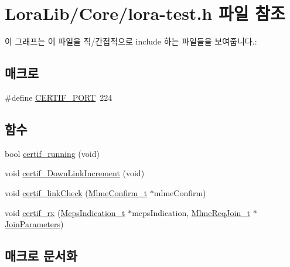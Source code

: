 \hypertarget{lora-test_8h}{}\section{Lora\+Lib/\+Core/lora-\/test.h 파일 참조}
\label{lora-test_8h}
이 그래프는 이 파일을 직/간접적으로 include 하는 파일들을 보여줍니다.\+:
\subsection*{매크로}
\begin{DoxyCompactItemize}
\item 
\#define \mbox{\hyperlink{lora-test_8h_a36fba7ec3073a500e5a2caaf0c361a99}{C\+E\+R\+T\+I\+F\+\_\+\+P\+O\+RT}}~224
\end{DoxyCompactItemize}
\subsection*{함수}
\begin{DoxyCompactItemize}
\item 
bool \mbox{\hyperlink{lora-test_8h_ae856642063d609fa42633f12c85fa318}{certif\+\_\+running}} (void)
\item 
void \mbox{\hyperlink{lora-test_8h_afd08e01f379119849a415a1d98e44c0d}{certif\+\_\+\+Down\+Link\+Increment}} (void)
\item 
void \mbox{\hyperlink{lora-test_8h_a39763fc2f0d7f70bf980b9508cd7e021}{certif\+\_\+link\+Check}} (\mbox{\hyperlink{group___l_o_r_a_m_a_c_ga73d9d9e11e282a6c258c4d22865fe824}{Mlme\+Confirm\+\_\+t}} $\ast$mlme\+Confirm)
\item 
void \mbox{\hyperlink{lora-test_8h_ad5e51928ecf0cca8d4f33f9e9c10aba4}{certif\+\_\+rx}} (\mbox{\hyperlink{group___l_o_r_a_m_a_c_ga202591b6553d63fae89bd42787496616}{Mcps\+Indication\+\_\+t}} $\ast$mcps\+Indication, \mbox{\hyperlink{group___l_o_r_a_m_a_c_gab12f7f7d9bdfb8067d56f7c9f1297d95}{Mlme\+Req\+Join\+\_\+t}} $\ast$\mbox{\hyperlink{lora_8c_aaa245b1db1384dd6fc0257bc479e760c}{Join\+Parameters}})
\end{DoxyCompactItemize}


\subsection{매크로 문서화}
\mbox{\label{lora-test_8h_a36fba7ec3073a500e5a2caaf0c361a99}} 
